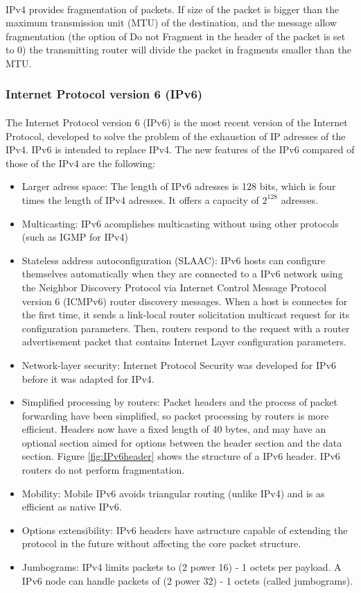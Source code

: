 \paragraph{}IPv4 provides fragmentation of packets. If size of the packet is bigger than the maximum transmission unit (MTU) of the destination, and the message allow fragmentation (the option of Do not Fragment in the header of the packet is set to 0) the transmitting router will divide the packet in fragments smaller than the MTU.

\subsubsection*{Internet Protocol version 6 (IPv6)\cite{IPv6}}
\paragraph{}The Internet Protocol version 6 (IPv6) is the most recent version of the Internet Protocol, developed to solve the problem of the exhaustion of IP adresses of the IPv4. IPv6 is intended to replace IPv4. The new features of the IPv6 compared of those of the IPv4 are the following:
\begin{itemize}
	\item Larger adress space: The length of IPv6 adresses is 128 bits, which is four times the length of IPv4 adresses. It offers a capacity of $2^{128}$ adresses.
	\item Multicasting: IPv6 acomplishes multicasting without using other protocols (such as IGMP for IPv4)
	\item Stateless address autoconfiguration (SLAAC): IPv6 hosts can configure themselves automatically when they are connected to a IPv6 network using the Neighbor Discovery Protocol via Internet Control Message Protocol version 6 (ICMPv6) router discovery messages. When a host is connectes for the first time, it sends a link-local router solicitation multicast request for its configuration parameters. Then, routers respond to the request with a router advertisement packet that contains Internet Layer configuration parameters.
	\item Network-layer security: Internet Protocol Security was developed for IPv6 before it was adapted for IPv4.
	\item Simplified processing by routers: Packet headers and the process of packet forwarding have been simplified, so packet processing by routers is more efficient. Headers now have a fixed length of 40 bytes, and may have an optional section aimed for options between the header section and the data section. Figure \ref{fig:IPv6header} shows the structure of a IPv6 header. IPv6 routers do not perform fragmentation.
	\item Mobility: Mobile IPv6 avoids triangular routing (unlike IPv4) and is as efficient as native IPv6.
	\item Options extensibility: IPv6 headers have astructure capable of extending the protocol in the future without affecting the core packet structure.
	\item Jumbograms: IPv4 limits packets to (2 power 16) - 1 octets per payload. A IPv6 node can handle packets of (2 power 32) - 1 octets (called jumbograms).
\end{itemize}
